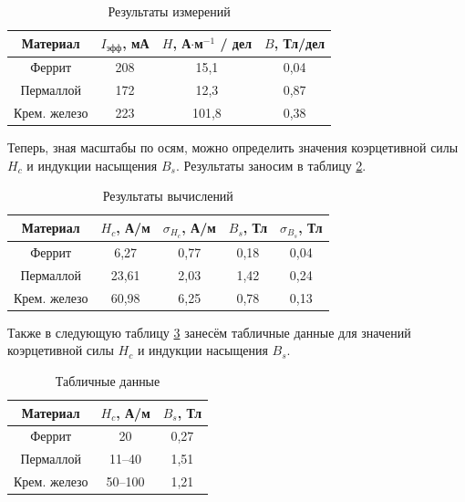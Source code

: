 \documentclass[a4paper,12pt]{article} %
\begin{document}
\begin{table}[H]
	\centering
	\begin{tabular}{|c|c|c|c|}
		\hline
		Материал     & $I_\text{эфф}$, мА & $H$, А$\cdot$м$^{-1}$ / дел & $B$, Тл/дел \\ \hline
		Феррит       & 208                & 15,1                        & 0,04        \\ \hline
		Пермаллой    & 172                & 12,3                        & 0,87        \\ \hline
		Крем. железо & 223                & 101,8                       & 0,38        \\ \hline
	\end{tabular}
	\caption{Результаты измерений}
	\label{tab:izm}
\end{table}

Теперь, зная масштабы по осям, можно определить значения коэрцетивной силы $ H_c $
и индукции насыщения $ B_s $. Результаты заносим в таблицу \ref{tab:vichisl}.

\begin{table}[H]
	\centering
	\begin{tabular}{|c|c|c|c|c|}
		\hline
		Материал     & $H_c$, А/м & $\sigma_{H_c}$, А/м & $B_s$, Тл & $\sigma_{B_s}$, Тл \\ \hline
		Феррит       & 6,27       & 0,77                & 0,18      & 0,04               \\ \hline
		Пермаллой    & 23,61      & 2,03                & 1,42      & 0,24               \\ \hline
		Крем. железо & 60,98      & 6,25                & 0,78      & 0,13               \\ \hline
	\end{tabular}
	\caption{Результаты вычислений}
	\label{tab:vichisl}
\end{table}

Также в следующую таблицу \ref{tab:tab} занесём табличные данные для значений коэрцетивной силы $ H_c $ и индукции насыщения $ B_s $.

\begin{table}[H]
	\centering
	\begin{tabular}{|c|c|c|}
		\hline
		Материал     & $H_c$, А/м & $B_s$, Тл \\ \hline
		Феррит       & 20         & 0,27      \\ \hline
		Пермаллой    & 11--40     & 1,51      \\ \hline
		Крем. железо & 50--100    & 1,21      \\ \hline
	\end{tabular}
	\caption{Табличные данные}
	\label{tab:tab}
\end{table}
\end{document}
